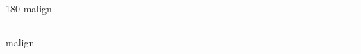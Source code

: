 
\begin{frame}
\begin{center}
\begin{turn}{180}
{\fontsize{2.5cm}{1em}\selectfont malign}
\end{turn}
\vspace{1em}\par  
\hrule
\vspace{1em}\par  
{\fontsize{2.5cm}{1em}\selectfont malign}
\end{center}
\end{frame}

